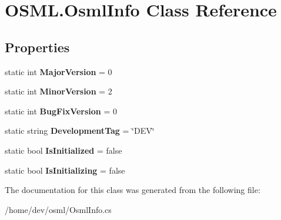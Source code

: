 \hypertarget{classOSML_1_1OsmlInfo}{}\section{O\+S\+M\+L.\+Osml\+Info Class Reference}
\label{classOSML_1_1OsmlInfo}
\subsection*{Properties}
\begin{DoxyCompactItemize}
\item 
\mbox{\label{classOSML_1_1OsmlInfo_aa13a2ea40dbe35caa4dd5abba830b8e6}} 
static int {\bfseries Major\+Version} = 0
\item 
\mbox{\label{classOSML_1_1OsmlInfo_a7f1a8b1a5d94be79441440c3f7d21503}} 
static int {\bfseries Minor\+Version} = 2
\item 
\mbox{\label{classOSML_1_1OsmlInfo_a78820812c89c3dd032391658aa8eeb5e}} 
static int {\bfseries Bug\+Fix\+Version} = 0
\item 
\mbox{\label{classOSML_1_1OsmlInfo_a4d0acb5f0a94737d4753069bf1e34be0}} 
static string {\bfseries Development\+Tag} = \char`\"{}D\+EV\char`\"{}
\item 
\mbox{\label{classOSML_1_1OsmlInfo_a01b615095315e59887868db93e829731}} 
static bool {\bfseries Is\+Initialized} = false
\item 
\mbox{\label{classOSML_1_1OsmlInfo_af7122949ceaf2f24443d572239bc156e}} 
static bool {\bfseries Is\+Initializing} = false
\end{DoxyCompactItemize}


The documentation for this class was generated from the following file\+:\begin{DoxyCompactItemize}
\item 
/home/dev/osml/Osml\+Info.\+cs\end{DoxyCompactItemize}
